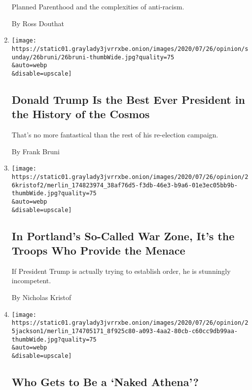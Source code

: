 \begin{enumerate}
  Planned Parenthood and the complexities of anti-racism.

  By Ross Douthat
\item
  \href{/2020/07/25/opinion/sunday/trump-lies.html}{}

  \texttt{[image: https://static01.graylady3jvrrxbe.onion/images/2020/07/26/opinion/sunday/26bruni/26bruni-thumbWide.jpg?quality=75\\\&auto=webp\\\&disable=upscale]}

  \hypertarget{donald-trump-is-the-best-ever-president-in-the-history-of-the-cosmos}{%
  \subsection{Donald Trump Is the Best Ever President in the History of
  the
  Cosmos}\label{donald-trump-is-the-best-ever-president-in-the-history-of-the-cosmos}}

  That's no more fantastical than the rest of his re-election campaign.

  By Frank Bruni
\item
  \href{/2020/07/25/opinion/sunday/portland-protest-federal-troops.html}{}

  \texttt{[image: https://static01.graylady3jvrrxbe.onion/images/2020/07/26/opinion/26kristof2/merlin\_174823974\_38af76d5-f3db-46e3-b9a6-01e3ec05bb9b-thumbWide.jpg?quality=75\\\&auto=webp\\\&disable=upscale]}

  \hypertarget{in-portlands-so-called-war-zone-its-the-troops-who-provide-the-menace}{%
  \subsection{In Portland's So-Called War Zone, It's the Troops Who
  Provide the
  Menace}\label{in-portlands-so-called-war-zone-its-the-troops-who-provide-the-menace}}

  If President Trump is actually trying to establish order, he is
  stunningly incompetent.

  By Nicholas Kristof
\item
  \href{/2020/07/25/opinion/sunday/portland-protests-white.html}{}

  \texttt{[image: https://static01.graylady3jvrrxbe.onion/images/2020/07/26/opinion/25jackson1/merlin\_174705171\_8f925c80-a093-4aa2-80cb-c60cc9db99aa-thumbWide.jpg?quality=75\\\&auto=webp\\\&disable=upscale]}

  \hypertarget{who-gets-to-be-a-naked-athena}{%
  \subsection{Who Gets to Be a `Naked
  Athena'?}\label{who-gets-to-be-a-naked-athena}}


\end{enumerate}
